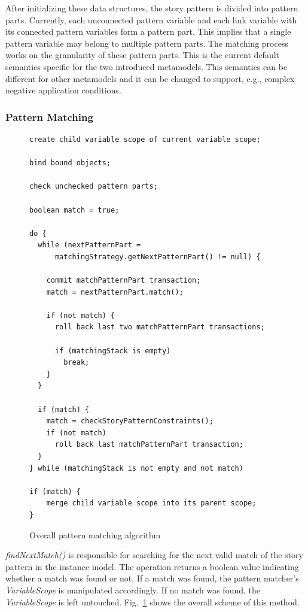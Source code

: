 After initializing these data structures, the story pattern is divided into pattern parts.
Currently, each unconnected pattern variable and each link variable with its connected pattern variables form a pattern part.
This implies that a single pattern variable may belong to multiple pattern parts.
The matching process works on the granularity of these pattern parts.
This is the current default semantics specific for the two introduced metamodels.
This semantics can be different for other metamodels and it can be changed to support, e.g., complex negative application conditions.


\subsubsection{Pattern Matching}
\label{sec:spm_pattern_matching}

\lstset{
	numbers=left
}

\begin{figure}
\begin{lstlisting}
create child variable scope of current variable scope;

bind bound objects;

check unchecked pattern parts;

boolean match = true;

do {
  while (nextPatternPart = 
      matchingStrategy.getNextPatternPart() != null) {
    
    commit matchPatternPart transaction;
    match = nextPatternPart.match();
    
    if (not match) {
      roll back last two matchPatternPart transactions;
      
      if (matchingStack is empty)
        break;
    }
  }
    
  if (match) {
    match = checkStoryPatternConstraints();
    if (not match)
      roll back last matchPatternPart transaction;
  }
} while (matchingStack is not empty and not match)

if (match) {
	merge child variable scope into its parent scope;
}
\end{lstlisting}
\caption{Overall pattern matching algorithm}
\label{listing:pattern_matcher_execution}
\end{figure}

\emph{findNextMatch()} is responsible for searching for the next valid match of the story pattern in the instance model.
The operation returns a boolean value indicating whether a match was found or not.
If a match was found, the pattern matcher's \emph{VariableScope} is manipulated accordingly.
If no match was found, the \emph{VariableScope} is left untouched.
Fig.~\ref{listing:pattern_matcher_execution} shows the overall scheme of this method.


